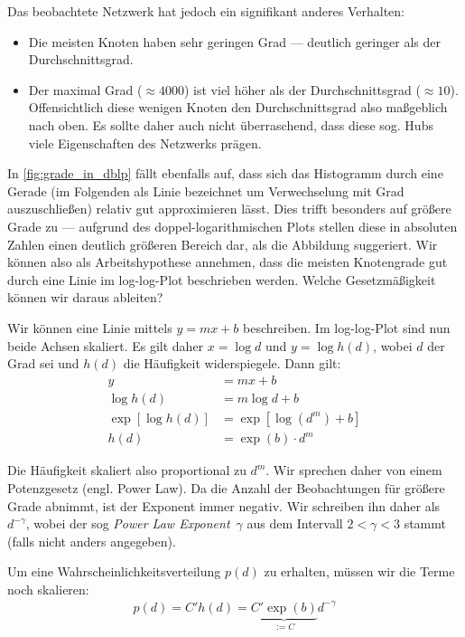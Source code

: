 \noindent
Das beobachtete Netzwerk hat jedoch ein signifikant anderes Verhalten:
\begin{itemize}
    \item Die meisten Knoten haben sehr geringen Grad --- deutlich geringer als der Durchschnittsgrad.
    \item Der maximal Grad ($\approx 4000$) ist viel höher als der Durchschnittsgrad ($\approx 10$).
          Offensichtlich  diese wenigen Knoten den Durchschnittsgrad also maßgeblich nach oben.
          Es sollte daher auch nicht überraschend, dass diese sog. Hubs viele Eigenschaften des Netzwerks prägen.
\end{itemize}

In \cref{fig:grade_in_dblp}  fällt ebenfalls auf, dass sich das Histogramm durch eine Gerade (im Folgenden als Linie bezeichnet um Verwechselung mit Grad auszuschließen) relativ gut approximieren lässt.
Dies trifft besonders auf größere Grade zu --- aufgrund des doppel-logarithmischen Plots stellen diese in absoluten Zahlen einen deutlich größeren Bereich dar, als die Abbildung suggeriert.
Wir können also als Arbeitshypothese annehmen, dass die meisten Knotengrade gut durch eine Linie im log-log-Plot beschrieben werden.
Welche Gesetzmäßigkeit können wir daraus ableiten?

Wir können eine Linie mittels $y = mx + b$ beschreiben.
Im log-log-Plot sind nun beide Achsen skaliert.
Es gilt daher $x = \log d$ und $y = \log h(d)$, wobei $d$ der Grad sei und $h(d)$ die Häufigkeit widerspiegele.
Dann gilt:
\begin{align}
    y               & = mx + b              \\
    \log h(d)       & = m\log d + b         \\
    \exp[\log h(d)] & = \exp[\log(d^m) + b] \\
    h(d)            & = \exp(b) \cdot d^m
\end{align}

Die Häufigkeit skaliert also proportional zu $d^m$.
Wir  sprechen daher von einem Potenzgesetz (engl. Power Law).
Da die Anzahl der Beobachtungen für größere Grade abnimmt, ist der Exponent immer negativ.
Wir schreiben ihn daher als $d^{-\gamma}$, wobei der sog \emph{Power Law Exponent}~$\gamma$ aus dem Intervall $2 < \gamma < 3$ stammt (falls nicht anders angegeben).

Um eine Wahrscheinlichkeitsverteilung $p(d)$ zu erhalten, müssen wir die Terme noch skalieren:
\begin{align}
    p(d) = C' h(d) = \underbrace{C'\exp(b)}_{:= C} d^{-\gamma}
\end{align}

